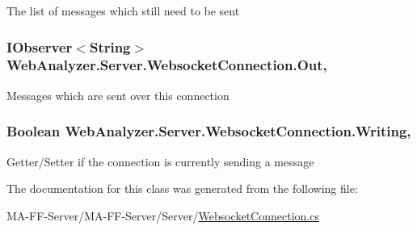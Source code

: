 The list of messages which still need to be sent 

\hypertarget{class_web_analyzer_1_1_server_1_1_websocket_connection_a1f0be7b1ff80c5b742204d0883157578}{}
\subsubsection[{Out}]{\setlength{\rightskip}{0pt plus 5cm}I\+Observer$<$String$>$ Web\+Analyzer.\+Server.\+Websocket\+Connection.\+Out\hspace{0.3cm}{\ttfamily [get]}, {\ttfamily [set]}}\label{class_web_analyzer_1_1_server_1_1_websocket_connection_a1f0be7b1ff80c5b742204d0883157578}


Messages which are sent over this connection 

\hypertarget{class_web_analyzer_1_1_server_1_1_websocket_connection_a973edb4f0e5e1644f551bf132ae77183}{}
\subsubsection[{Writing}]{\setlength{\rightskip}{0pt plus 5cm}Boolean Web\+Analyzer.\+Server.\+Websocket\+Connection.\+Writing\hspace{0.3cm}{\ttfamily [get]}, {\ttfamily [set]}}\label{class_web_analyzer_1_1_server_1_1_websocket_connection_a973edb4f0e5e1644f551bf132ae77183}


Getter/\+Setter if the connection is currently sending a message 



The documentation for this class was generated from the following file\+:\begin{DoxyCompactItemize}
\item 
M\+A-\/\+F\+F-\/\+Server/\+M\+A-\/\+F\+F-\/\+Server/\+Server/\hyperlink{_websocket_connection_8cs}{Websocket\+Connection.\+cs}\end{DoxyCompactItemize}
